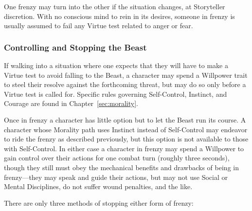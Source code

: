 One frenzy may turn into the other if the situation changes, at Storyteller discretion.  With no 
conscious mind to rein in its desires, someone in frenzy is usually assumed to fail any Virtue test 
related to anger or fear.

\subsubsection{Controlling and Stopping the Beast}
If walking into a situation where one expects that they will have to make a Virtue test to avoid 
falling to the Beast, a character may spend a Willpower trait to steel their resolve against the 
forthcoming threat, but may do so only before a Virtue test is called for.  Specific rules governing 
Self-Control, Instinct, and Courage are found in Chapter~\ref{sec:morality}.

Once in frenzy a character has little option but to let the Beast run its course.  A character whose 
Morality path uses Instinct instead of Self-Control may endeavor to ride the frenzy as described 
previously, but this option is not available to those with Self-Control.  In either case a character 
in frenzy may spend a Willpower to gain control over their actions for one combat turn (roughly three 
seconds), though they still must obey the mechanical benefits and drawbacks of being in frenzy---they 
may speak and guide their actions, but may not use Social or Mental Disciplines, do not suffer wound 
penalties, and the like.

There are only three methods of stopping either form of frenzy:

